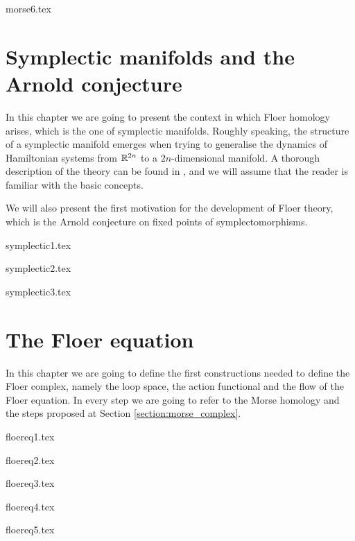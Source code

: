 \documentclass[a4paper,11pt]{book}
\begin{document}
 {morse6.tex}

 \chapter{Symplectic manifolds and the Arnold conjecture}
In this chapter we are going to present the context in which Floer homology arises, which is the one of symplectic manifolds. Roughly speaking, the structure of a symplectic manifold emerges when trying to generalise the dynamics of Hamiltonian systems from $\mathbb{R}^{2n}$ to a $2n$-dimensional manifold. A thorough description of the theory can be found in \cite{da2001lectures}, and we will assume that the reader is familiar with the basic concepts.

We will also present the first motivation for the development of Floer theory, which is the Arnold conjecture on fixed points of symplectomorphisms.

{symplectic1.tex}

{symplectic2.tex}

{symplectic3.tex}

 \chapter{The Floer equation}
 In this chapter we are going to define the first constructions needed to define the Floer complex, namely the loop space, the action functional and the flow of the Floer equation. In every step we are going to refer to the Morse homology and the steps proposed at Section \ref{section:morse_complex}.

 {floereq1.tex}

 {floereq2.tex}

 {floereq3.tex}

 {floereq4.tex}

 {floereq5.tex}
\end{document}
